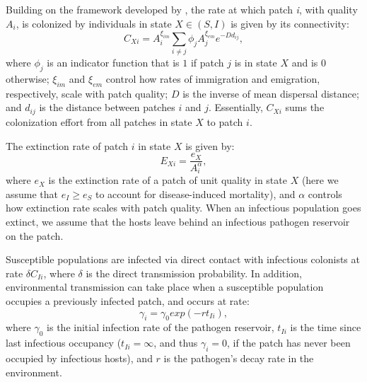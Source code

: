 \documentclass{svjour3}
\begin{document}
Building on the framework developed by \cite{Hanski2003}, the rate at which patch \emph{i}, with quality $A_i$, is colonized by individuals in state $X \in (S,I)$ is given by its connectivity:
\begin{equation}
C_{Xi}=A_i^{\xi_{im}} \sum_{i\neq j }\phi_jA_j^{\xi_{em}}e^{-D d_{ij}},
\label{connectivity}
\end{equation}
where $\phi_j$ is an indicator function that is $1$ if patch $j$ is in state $X$ and is $0$ otherwise; $\xi_{im}$ and $\xi_{em}$ control how rates of immigration and emigration, respectively, scale with patch quality; $D$ is the inverse of mean dispersal distance; and $d_{ij}$ is the distance between patches $i$ and $j$.  Essentially, $C_{Xi}$ sums the colonization effort from all patches in state $X$ to patch $i$.  

The extinction rate of patch $i$ in state $X$ is given by:
\begin{equation}
E_{Xi}=\frac{e_X}{A_i^\alpha},
\end{equation}
where $e_X$ is the extinction rate of a patch of unit quality in state $X$ (here we assume that $e_I \geq e_S$ to account for disease-induced mortality), and $\alpha$ controls how extinction rate scales with patch quality.  When an infectious population goes extinct, we assume that the hosts leave behind an infectious pathogen reservoir on the patch.  

Susceptible populations are infected via direct contact with infectious colonists at rate $\delta C_{Ii}$, where $\delta$ is the direct transmission probability.  In addition, environmental transmission can take place when a susceptible population occupies a previously infected patch, and occurs at rate:
\begin{equation}
\gamma_i=\gamma_0exp(-rt_{Ii}),
\end{equation}
where $\gamma_0$ is the initial infection rate of the pathogen reservoir, $t_{Ii}$ is the time since last infectious occupancy ($t_{Ii} = \infty$, and thus $\gamma_i = 0$, if the patch has never been occupied by infectious hosts), and $r$ is the pathogen's decay rate in the environment.
\end{document}
